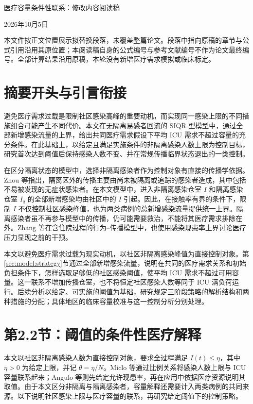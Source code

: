 \documentclass[UTF8,a4paper,zihao=-4,fontset=fandol]{ctexart}
\theoremstyle{remark}
\begin{document}
\begin{center}
{\Large 医疗容量条件性联系：修改内容阅读稿}\par
\vspace{5pt}2026年10月5日\par
\end{center}
本文件按正文位置展示拟替换段落，未覆盖整篇论文。段落中指向原稿的章节与公式引用沿用其原位置；本阅读稿自身的公式编号与参考文献编号不作为论文最终编号。全部计算结果沿用原稿，本轮没有新增医疗需求模拟或临床标定。
\section*{摘要开头与引言衔接}
避免医疗需求过载是限制社区感染高峰的重要动机，而实现同一感染上限的不同措施组合可能产生不同代价。本文在无隔离易感者回流的 SIQR 型模型中，通过全部新增感染流量的上界，给出共同医疗需求假设下平均 ICU 需求不超过容量的充分条件。在此基础上，以给定且满足实施条件的非隔离感染人数上限为控制目标，研究首次达到阈值后保持感染人数不变、并在常规传播临界状态退出的一类控制。

\medskip
在区分隔离状态的模型中，选择非隔离感染者作为控制对象有直接的传播学依据。Zhou 等\cite{Zhou2024SPCI}指出，隔离区外的传播主要由尚未被隔离或追踪的感染者造成，其中包括不易被发现的无症状感染者。在本文模型中，进入非隔离感染仓室 $I$ 和隔离感染仓室 $I_q$ 的全部新增感染均由社区中的 $I$ 引起。因此，在接触率有界的条件下，限制 $I$ 不仅控制社区感染峰值，也为两类病例的总新增感染流量提供统一上界。隔离感染者虽不再参与模型中的传播，仍可能需要救治，不能将其医疗需求排除在外。Zhang 等\cite{Zhang2026Behavior}在含住院过程的行为--传播模型中，也使用感染现患率上界讨论医疗压力显现之前的干预。

本文以避免医疗需求过载为现实动机，以社区非隔离感染峰值为直接控制对象。第\ref{sec:model:strategy}节通过全部新增感染流量，说明在共同的医疗需求关系和初始负担条件下，怎样选取足够低的社区感染阈值，使平均 ICU 需求不超过可用容量。这一联系不增加传播仓室，也不将恒定社区感染人数等同于 ICU 满负荷运行。后续分析以给定、可实施的阈值为基础，研究规定三阶段策略的解析结构和两种措施的分配；具体地区的临床容量校准与这一控制分析分别处理。
\clearpage
\section*{第2.2节：阈值的条件性医疗解释}
本文以社区非隔离感染人数为直接控制对象，要求全过程满足 $I(t)\le\eta$，其中 $\eta>0$ 为给定上限，并记 $\theta=\eta/N$。Miclo 等\cite{Miclo2022ICU}通过比例关系将感染人数上限与 ICU 容量联系起来；Angulo 等\cite{Angulo2021}则先给定允许现患率，再在应用中依据医疗资源说明其取值。由于本文区分非隔离与隔离感染者，容量解释还需要计入两类病例的共同来源。以下说明社区感染上限与医疗容量的联系，再研究给定阈值下的控制策略。
\end{document}
